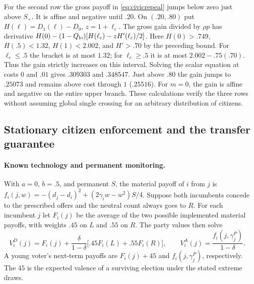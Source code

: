 \documentclass[11pt,letterpaper]{article}
\begin{document}
For the second row the gross payoff in \eqref{eq:civicrepeal} jumps below zero just above $S_+$. It is affine and negative until $.20$. On $(.20,.80)$ put $H(\ell)=D_1(\ell)-D_0$, $z=1+\ell_c$. The gross gain divided by $\rho p$ has derivative $H(0)-(1-Q_{\rm lo})[H(\ell_c)-zH'(\ell_c)/2]$. Here $H(0)>.749$, $H(.5)<1.32$, $H(1)<2.002$, and $H'>.70$ by the preceding bound. For $\ell_c\le.5$ the bracket is at most $1.32$; for $\ell_c\ge.5$ it is at most $2.002-.75(.70)$. Thus the gain strictly increases on this interval. Solving the scalar equation at costs $0$ and $.01$ gives $.309303$ and $.348547$. Just above $.80$ the gain jumps to $.25073$ and remains above cost through $1$ ($.25516$). For $m=0$, the gain is affine and negative on the entire upper branch. These calculations verify the three rows without assuming global single crossing for an arbitrary distribution of citizens.
\subsection{Stationary citizen enforcement and the transfer guarantee}\label{app:civicmpe}

\paragraph{Known technology and permanent monitoring.}
With $a=0$, $b=.5$, and permanent $S$, the material payoff of $i$ from $j$ is $f_i(j,w)=-(d_j-d_i)^2+(2\gamma_iw-w^2)S/4$. Suppose both incumbents concede to the prescribed offers and the neutral count always goes to $R$. For each incumbent $j$ let $F_i(j)$ be the average of the two possible implemented material payoffs, with weights $.45$ on $L$ and $.55$ on $R$. The party values then solve
\[
 V_i^D(j)=F_i(j)+\frac{\delta}{1-\delta}\big[.45F_i(L)+.55F_i(R)\big],
 \qquad V_i^A(j)=\frac{f_i(j,\gamma_j^P)}{1-\delta}.
\]
A young voter's next-term payoffs are $F_i(j)+45$ and $f_i(j,\gamma_j^P)$, respectively. The $45$ is the expected valence of a surviving election under the stated extreme draws.
\end{document}
